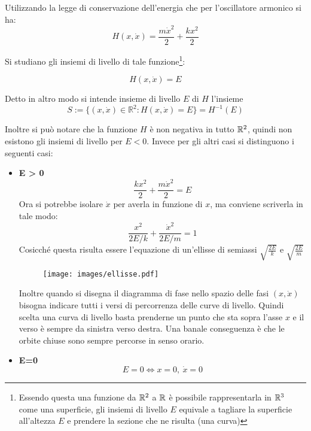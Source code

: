 \documentclass[Main.tex]{subfiles}
\begin{document}
\begin{tema}
	Utilizzando la legge di conservazione dell'energia che per l'oscillatore armonico si ha:
\begin{equation}
		H(x, \dot x) = \frac{m \dot x^2}{2} + \frac{k x^2}{2}
\end{equation}


Si studiano gli insiemi di livello di tale funzione\footnote{Essendo questa una funzione da $\mathbb{R}^2$ a $\mathbb{R}$ è possibile rappresentarla in $\mathbb{R}^3$ come una superficie, gli insiemi di livello $E$ equivale a tagliare la superficie all'altezza $E$ e prendere la sezione che ne risulta (una curva)}:

\begin{equation}
	H(x,\dot x) = E
\end{equation}

Detto in altro modo si intende insieme di livello $E$ di $H$ l'insieme 
\begin{equation}
	S:= \{(x, \dot x) \in \mathbb{R}^2 : H(x, \dot x) = E \} = H^{-1}(E)
\end{equation}


Inoltre si può notare che la funzione $H$ è non negativa in tutto $\mathbb{R}^2$, quindi non esistono gli insiemi di livello per $E<0$.
Invece per gli altri casi si distinguono i seguenti casi:
\begin{itemize}
\item \textbf{E > 0} $$
\frac{kx^2}{2} + \frac{m \dot x^2}{2}=E
$$
Ora si potrebbe isolare $\dot x$ per averla in funzione di $x$, ma conviene scriverla in tale modo:
$$
\frac{x^2}{2E/k} + \frac{\dot x^2}{2E/m}=1
$$
Cosicché questa risulta essere l'equazione di un'ellisse di semiassi $\sqrt{\frac{2E}{k}}$ e $\sqrt{\frac{2E}{m}}$


\begin{figure}[H]
	\centering 	
	\hspace{2cm} \texttt{[image: images/ellisse.pdf]}{}
\end{figure}

  	
Inoltre quando si disegna il diagramma di fase nello spazio delle fasi $(x,\dot x)$ bisogna indicare tutti i versi di percorrenza delle curve di livello. Quindi scelta una curva di livello basta prenderne un punto che sta sopra l'asse $x$ e il verso è sempre da sinistra verso destra. Una banale conseguenza è che le orbite chiuse sono sempre percorse in senso orario.

\item \textbf{E=0}
$$E=0 \iff x=0, \ \dot x=0$$


\end{itemize}
\end{tema}
\end{document}
